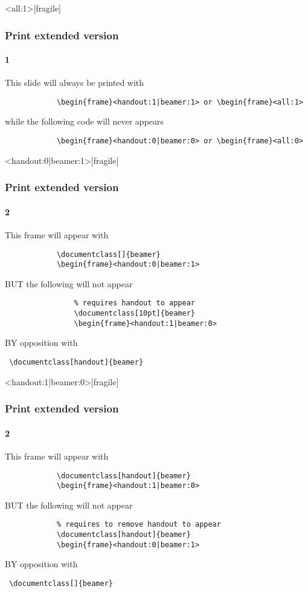 	\begin{frame}<all:1>[fragile]
		\frametitle{Print extended version}
		\framesubtitle{1}
		
		This slide will always be printed with 
		\begin{verbatim}			
			\begin{frame}<handout:1|beamer:1> or \begin{frame}<all:1>
		\end{verbatim}
		
		while the following code will never appears
		\begin{verbatim}			
			\begin{frame}<handout:0|beamer:0> or \begin{frame}<all:0>	
		\end{verbatim}
	\end{frame}
	
	\begin{frame}<handout:0|beamer:1>[fragile]
		\frametitle{Print extended version}
		\framesubtitle{2}
		
		This frame will appear with
		\begin{verbatim}			
			\documentclass[]{beamer}
			\begin{frame}<handout:0|beamer:1>
		\end{verbatim}
		
		BUT the following will not appear
		\begin{verbatim}			
				% requires handout to appear
				\documentclass[10pt]{beamer} 
				\begin{frame}<handout:1|beamer:0>
		\end{verbatim}
		
		BY opposition with \begin{verbatim} \documentclass[handout]{beamer}
		\end{verbatim}
	\end{frame}
			
	\begin{frame}<handout:1|beamer:0>[fragile]
		\frametitle{Print extended version}
		\framesubtitle{2}
		
		This frame will appear with
		\begin{verbatim}			
			\documentclass[handout]{beamer}
			\begin{frame}<handout:1|beamer:0>
		\end{verbatim}
		
		BUT the following will not appear
		\begin{verbatim}			
		    % requires to remove handout to appear
			\documentclass[handout]{beamer} 
			\begin{frame}<handout:0|beamer:1>
		\end{verbatim}
		
		BY opposition with \begin{verbatim} \documentclass[]{beamer}
		\end{verbatim}
	\end{frame}
